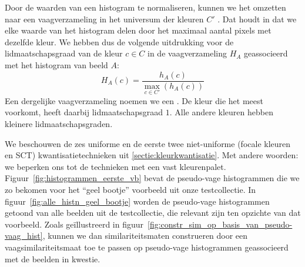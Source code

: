 Door de waarden van een histogram te normaliseren, kunnen we het omzetten naar 
een vaagverzameling in het universum der kleuren $C'$ 
\cite{debaets:similariteitsmaten_voor_kleurbeelden, vanderweken:similariteitsmaten, vertan:embedding_fuzzy_logic_in_cbir}. 
Dat houdt in dat we elke 
waarde van het histogram delen door het maximaal aantal pixels met dezelfde 
kleur. We hebben dus de volgende uitdrukking voor de lidmaatschapsgraad van de 
kleur $c \in C$ in de vaagverzameling $H_A$ geassocieerd met het histogram 
van beeld $A$: 
\begin{displaymath}
H_A(c) = \frac{\displaystyle h_A(c)}{\displaystyle \max_{c \in C'}(h_A(c))}
\end{displaymath}
Een dergelijke vaagverzameling noemen we een . 
De kleur die het meest voorkomt, heeft daarbij lidmaatschapsgraad $1$. Alle 
andere kleuren hebben kleinere lidmaatschapsgraden. 

We beschouwen de zes uniforme en de eerste twee niet-uniforme (focale kleuren en SCT) 
kwantisatietechnieken uit \ref{sectie:kleurkwantisatie}. 
Met andere woorden: we beperken ons tot de technieken met een vast kleurenpalet.
Figuur~\ref{fig:histogrammen_eerste_vb} bevat
de pseudo-vage histogrammen die we zo bekomen voor het ``geel bootje'' voorbeeld
uit onze testcollectie. In figuur~\ref{fig:alle_histn_geel_bootje} worden de pseudo-vage histogrammen
getoond van alle beelden uit de testcollectie, die relevant zijn ten opzichte van dat voorbeeld.
Zoals ge\"illustreerd in figuur~\ref{fig:constr_sim_op_basis_van_pseudo-vaag_hist}, kunnen we 
dan similariteitsmaten construeren door een vaagsimilariteitsmaat toe te passen op 
pseudo-vage histogrammen geassocieerd met de beelden in kwestie.

